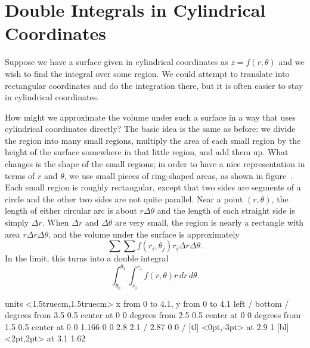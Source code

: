 \section{Double Integrals in Cylindrical Coordinates}{}{}
\label{sec:Double Integrals in Cylindrical Coordinates}
\nobreak
Suppose we have a surface given in cylindrical coordinates as
$z=f(r,\theta)$ and we wish to find the integral over some region. We
could attempt to translate into rectangular coordinates and do the
integration there, but it is often easier to stay in cylindrical
coordinates.

How might we approximate the volume under such a surface in a way that
uses cylindrical coordinates directly? The basic idea is the same as
before: we divide the region into many small regions, multiply the
area of each small region by the height of the surface somewhere in
that little region, and add them up. What changes is the shape of the
small regions; in order to have a nice representation in terms of $r$
and $\theta$, we use small pieces of ring-shaped areas, as shown in
figure~. Each small region
is roughly rectangular, except that two sides are segments of a circle
and the other two sides are not quite parallel. Near a point
$(r,\theta)$, the length of either circular arc is about
$r\Delta\theta$ and the length of each straight side is simply $\Delta
r$. When $\Delta r$ and $\Delta \theta$ are very small, the region is
nearly a rectangle with area $r\Delta r\Delta\theta$, and the volume
under the surface is approximately
$$\sum\sum f(r_i,\theta_j)r_i\Delta r\Delta\theta.$$
In the limit, this turns into a double integral
$$\int_{\theta_0}^{\theta_1}\int_{r_0}^{r_1} f(r,\theta)r\,dr\,d\theta.$$

\figure
\vbox{\beginpicture
\normalgraphs
\ninepoint
\setcoordinatesystem units <1.5truecm,1.5truecm>
\setplotarea x from 0 to 4.1, y from 0 to 4.1
\axis left  /
\axis bottom  /
 degrees from 3.5 0.5 center at 0 0
 degrees from 2.5 0.5 center at 0 0
 degrees from 1.5 0.5 center at 0 0
\setlinear
{} 1.166 0 0 2.8 2.1 /
 2.87 0 0 /
 [tl] <0pt,-3pt> at 2.9 1
 [bl] <2pt,2pt> at 3.1 1.62
\endpicture}

